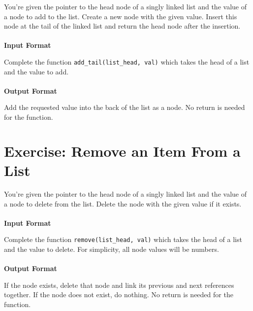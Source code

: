 \documentclass{42-en}
\begin{document}
\exnumber{\exercicenumber}

\makeheaderfiles
    You're given the pointer to the head node of a singly linked list and
    the value of a node to add to the list. Create a new node with the given
    value. Insert this node at the tail of the linked list and return the head
    node after the insertion.
    \\
    \\
    \textbf{Input Format}
    
    Complete the function \texttt{add\_tail(list\_head, val)} which takes the head of
    a list and the value to add.
    \\
    \\
    \textbf{Output Format}

    Add the requested value into the back of the list as a node. No return is
    needed for the function.

\nextexercice

\chapter{Exercise\exercicenumber: Remove an Item From a List}

\exnumber{\exercicenumber}

\makeheaderfiles
    You're given the pointer to the head node of a singly linked list and
    the value of a node to delete from the list. Delete the node with the given
    value if it exists.
    \\
    \\
    \textbf{Input Format}
    
    Complete the function \texttt{remove(list\_head, val)} which takes the head of
    a list and the value to delete. For simplicity, all node values will be numbers.
    \\
    \\
    \textbf{Output Format}
    
    If the node exists, delete that node and link its previous and next references
    together. If the node does not exist, do nothing. No return is needed for the
    function.

\nextexercice
\end{document}
